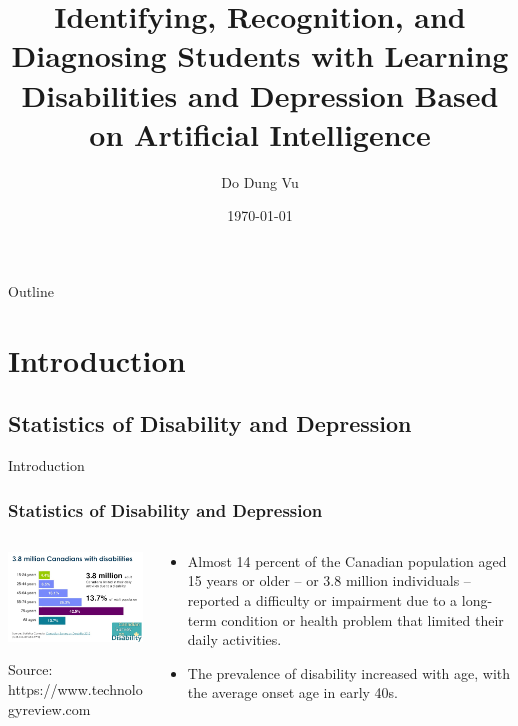 \documentclass{beamer}
\title[Molecules in \LaTeX{}]{Identifying, Recognition, and Diagnosing Students with Learning Disabilities and Depression Based on Artificial Intelligence}
\author{Do Dung Vu}
\institute{Supervised by: Prof. Sylvie Ratté}
\date{\today}
\begin{document}
\begin{frame}
  \titlepage
\end{frame}

\begin{frame}{Outline}
  \tableofcontents
\end{frame}

\section{Introduction}
\subsection{Statistics of Disability and Depression}
\begin{frame}{Introduction}

\frametitle{Statistics of Disability and Depression}

\begin{columns}
		\begin{column}{0.5\textwidth}  %
		\begin{center}
			\includegraphics[width=1\textwidth]{CanadianSurveyOfDisability.jpg}
		\end{center}
		{\tiny 	Source: https://www.technologyreview.com}
	\end{column}
	\begin{column}{0.5\textwidth}
		\begin{itemize}
			\item 	Almost 14 percent of the Canadian population aged 15 years or older – or 3.8 million individuals – reported a difficulty or impairment due to a long-term condition or health problem that limited their daily activities.
			\item The prevalence of disability increased with age, with the average onset age in early 40s.
			
		\end{itemize}
		
	\end{column}

\end{columns}
\end{frame}
\end{document}
